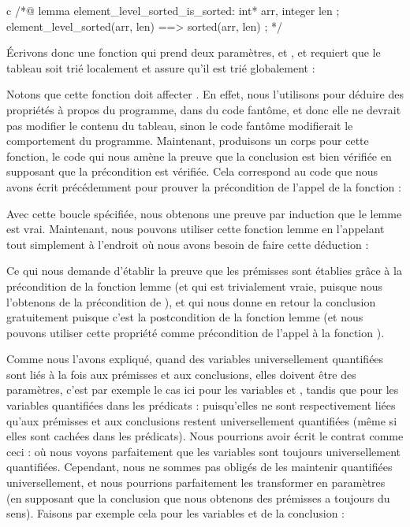 \begin{CodeBlock}{c}
/*@
  lemma element_level_sorted_is_sorted:
    \forall int* arr, integer len ;
       element_level_sorted(arr, len) ==> sorted(arr, len) ;
*/
\end{CodeBlock}


Écrivons donc une fonction qui prend deux paramètres,  et
, et requiert que le tableau soit trié localement et assure
qu'il est trié globalement :




Notons que cette fonction doit affecter .
En effet, nous l'utilisons pour déduire des propriétés à propos du programme, dans
du code fantôme, et donc elle ne devrait pas modifier le contenu du tableau, sinon
le code fantôme modifierait le comportement du programme. Maintenant, produisons un
corps pour cette fonction, le code qui nous amène la preuve que la conclusion est
bien vérifiée en supposant que la précondition est vérifiée. Cela correspond au
code que nous avons écrit précédemment pour prouver la précondition de l'appel de
la fonction  :





Avec cette boucle spécifiée, nous obtenons une preuve par induction que le lemme
est vrai. Maintenant, nous pouvons utiliser cette fonction lemme en
l'appelant tout simplement à l'endroit où nous avons besoin de faire cette
déduction :




Ce qui nous demande d'établir la preuve que les prémisses sont établies grâce
à la précondition de la fonction lemme (et qui est trivialement vraie,
puisque nous l'obtenons de la précondition de ), et
qui nous donne en retour la conclusion gratuitement puisque c'est la postcondition
de la fonction lemme (et nous pouvons utiliser cette propriété comme
précondition de l'appel à la fonction ).


Comme nous l'avons expliqué, quand des variables universellement quantifiées
sont liés à la fois aux prémisses et aux conclusions, elles doivent être des
paramètres, c'est par exemple le cas ici pour les variables 
et , tandis que pour les variables quantifiées dans les
prédicats :
puisqu'elles ne sont respectivement liées qu'aux prémisses et aux conclusions
restent universellement quantifiées (même si elles sont cachées dans les
prédicats). Nous pourrions avoir écrit le contrat comme ceci :
où nous voyons parfaitement que les variables sont toujours universellement
quantifiées. Cependant, nous ne sommes pas obligés de les maintenir quantifiées
universellement, et nous pourrions parfaitement les transformer en paramètres
(en supposant que la conclusion que nous obtenons des prémisses a toujours du
sens). Faisons par exemple cela pour les variables  et
 de la conclusion :


